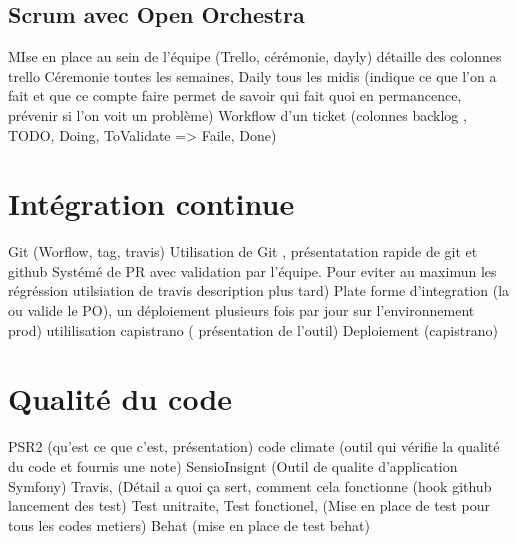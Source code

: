 \section{Scrum avec Open Orchestra}
MIse en place au sein de l'équipe (Trello, cérémonie, dayly)
détaille des colonnes trello 
Céremonie toutes les semaines,
Daily tous les midis (indique ce que l'on a fait et que ce compte faire permet de savoir qui fait quoi en permancence, 
prévenir si l'on voit un problème)
Workflow d'un ticket (colonnes backlog , TODO, Doing, ToValidate => Faile, Done)
\chapter{Intégration continue}
Git (Worflow, tag, travis) 
Utilisation de Git , présentatation rapide de git et github
Systémé de PR avec validation par l'équipe. 
Pour eviter au maximun les régréssion utilsiation de travis description plus tard)
Plate forme d'integration (la ou valide le PO), un déploiement plusieurs fois par jour sur l'environnement prod) utililisation capistrano ( présentation de l'outil) 
Deploiement (capistrano)
\chapter{Qualité du code}
PSR2 (qu'est ce que c'est, présentation)
code climate (outil qui vérifie la qualité du code et fournis une note) 
SensioInsignt (Outil de qualite d'application Symfony)
Travis, (Détail a quoi ça sert, comment cela fonctionne (hook github lancement des test) 
Test unitraite, Test fonctionel, (Mise en place de test  pour tous les codes metiers) 
Behat (mise en place de test behat) 
